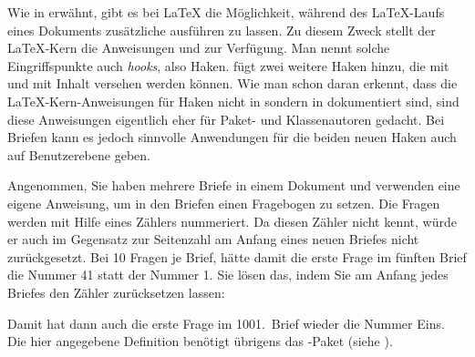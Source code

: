 \else%
  Wie in \cite{latex:clsguide} erwähnt, gibt es bei
  \LaTeX{} die Möglichkeit, während des \LaTeX-Laufs eines Dokuments zusätzliche
   ausführen zu lassen. Zu diesem Zweck stellt der
  \LaTeX-Kern die Anweisungen  und
   zur Verfügung. Man nennt
  solche Eingriffspunkte auch \emph{hooks}, also
  Haken. \KOMAScript{} fügt zwei weitere Haken hinzu, die mit
   und
   mit Inhalt versehen
  werden können. Wie man schon daran erkennt, dass die \LaTeX-Kern-Anweisungen
  für Haken nicht in \cite{latex:usrguide} sondern in \cite{latex:clsguide}
  dokumentiert sind, sind diese Anweisungen eigentlich eher für Paket- und
  Klassenautoren gedacht. Bei Briefen kann es jedoch sinnvolle Anwendungen für
  die beiden neuen Haken auch auf Benutzerebene geben.%
  \begin{Example}
    Angenommen, Sie haben mehrere Briefe in einem Dokument und verwenden
    eine eigene Anweisung, um in den Briefen einen Fragebogen
    zu setzen. Die Fragen werden mit Hilfe eines
    Zählers nummeriert. Da \KOMAScript{} diesen Zähler nicht kennt,
    würde er auch im Gegensatz zur Seitenzahl am Anfang eines
    neuen Briefes nicht zurückgesetzt. Bei 10 Fragen je Brief, hätte damit die
    erste Frage im fünften Brief die Nummer 41 statt der Nummer 1. Sie lösen
    das, indem Sie am Anfang jedes Briefes den Zähler zurücksetzen lassen:
\begin{lstcode}
  \newcommand{\Frage}[1]{%
    \refstepcounter{Frage}\par
    \noindent\begin{tabularx}{\textwidth}{l@{}X}
      \theFrage:~ & #1\\
    \end{tabularx}%
  }%
  \AtBeginLetter{\setcounter{Frage}{0}}
\end{lstcode}
    Damit hat dann auch die erste Frage im 1001.~Brief wieder die Nummer
    Eins. Die hier angegebene Definition benötigt übrigens das
    -Paket (siehe
    \cite{package:tabularx}).
  \end{Example}%
\fi
%
\EndIndexGroup


